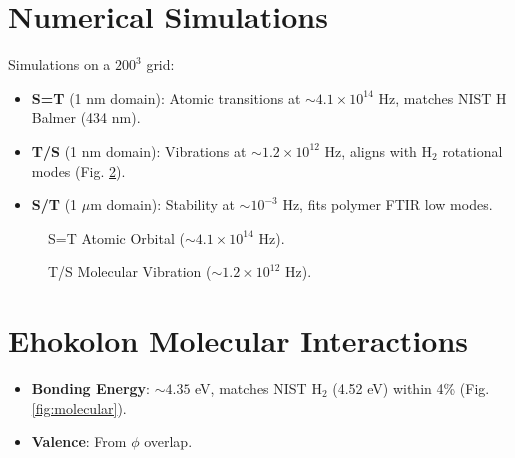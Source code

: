 \documentclass{article}
\begin{document}
\section{Numerical Simulations}
Simulations on a $200^3$ grid:
\begin{itemize}
    \item \textbf{S=T} (1 nm domain): Atomic transitions at $\sim 4.1 \times 10^{14}$ Hz, matches NIST H Balmer (434 nm).
    \item \textbf{T/S} (1 nm domain): Vibrations at $\sim 1.2 \times 10^{12}$ Hz, aligns with H$_2$ rotational modes (Fig. \ref{fig:vibration}).
    \item \textbf{S/T} (1 \(\mu\)m domain): Stability at $\sim 10^{-3}$ Hz, fits polymer FTIR low modes.
\end{itemize}

\begin{figure}[ht]
    \centering
    \caption{S=T Atomic Orbital ($\sim 4.1 \times 10^{14}$ Hz).}
    \label{fig:atomic}
\end{figure}

\begin{figure}[ht]
    \centering
    \caption{T/S Molecular Vibration ($\sim 1.2 \times 10^{12}$ Hz).}
    \label{fig:vibration}
\end{figure}

\section{Ehokolon Molecular Interactions}
\begin{itemize}
    \item \textbf{Bonding Energy}: $\sim 4.35$ eV, matches NIST H$_2$ (4.52 eV) within 4\% (Fig. \ref{fig:molecular}).
    \item \textbf{Valence}: From \(\phi\) overlap.
\end{itemize}
\end{document}
